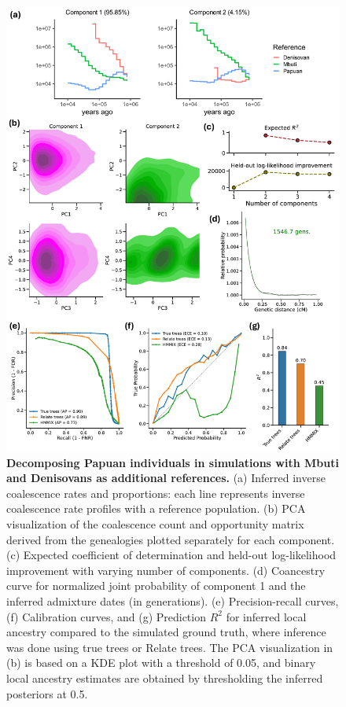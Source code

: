 \begin{figure}[h!]
    \centering
    \includegraphics[width=\linewidth]{figures/gb_sims/gb_sim_deni_nonghost.pdf}
    \captionsetup{width=\textwidth+3cm}     \caption{
    \footnotesize
    \textbf{Decomposing Papuan individuals in simulations with Mbuti and Denisovans as additional references.} (a) Inferred inverse coalescence rates and proportions: each line represents inverse coalescence rate profiles with a reference population. (b) PCA visualization of the coalescence count and opportunity matrix derived from the genealogies plotted separately for each component. (c) Expected coefficient of determination and held-out log-likelihood improvement with varying number of components. (d) Coancestry curve for normalized joint probability of component 1 and the inferred admixture dates (in generations).  (e) Precision-recall curves, (f) Calibration curves, and (g) Prediction $R^2$ for inferred local ancestry compared to the simulated ground truth, where inference was done using true trees or Relate trees. The PCA visualization in (b) is based on a KDE plot with a threshold of 0.05, and binary local ancestry estimates are obtained by thresholding the inferred posteriors at 0.5.
    }
    \label{fig:gb_sim_deni_nonghost}
\end{figure}


